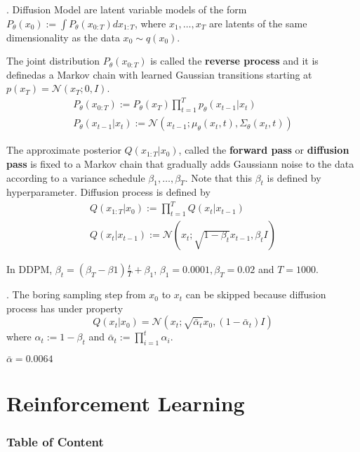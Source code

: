 \documentclass[8pt]{beamer}
\newcommand{\mc}[1]{\mathcal{#1}}
\newcommand{\tb}[1]{\textbf{#1}}
\begin{document}
\begin{frame}{.}
    Diffusion Model are latent variable models of the form $P_\theta(x_0) := \int P_\theta (x_{0:T})dx_{1:T}$, where $x_1, \dots, x_T$ are latents of the same dimensionality as the data $x_0 \sim q(x_0)$.

    The joint distribution $P_\theta(x_{0:T})$ is called the \tb{reverse process} and it is definedas a Markov chain with learned Gaussian transitions starting at $p(x_T) = \mc{N}(x_T; 0, I)$.
    \[
    \begin{gathered}
        P_\theta(x_{0:T}) := P_\theta(x_T) \prod_{t=1}^T p_\theta(x_{t-1}|x_{t}) \\
        P_\theta(x_{t-1}|x_{t}) := \mc{N}(x_{t-1}; \mu_\theta(x_t, t), \Sigma_\theta (x_t, t))
    \end{gathered}
    \]

    The approximate posterior $Q(x_{1:T}|x_0)$, called the \tb{forward pass} or \tb{diffusion pass} is fixed to a Markov chain that gradually adds Gaussiann noise to the data according to a variance schedule $\beta_1, \dots, \beta_T$. Note that this $\beta_t$ is defined by hyperparameter.
    Diffusion process is defined by
    \[
    \begin{gathered}
        Q(x_{1:T}|x_0) := \prod_{t=1}^T Q(x_t|x_{t-1})\\
        Q(x_t|x_{t-1}):= \mc{N}(x_t; \sqrt{1-\beta_t}x_{t-1}, \beta_t I)
    \end{gathered}
    \]

    In DDPM, $\beta_t = (\beta_T - \beta1)\frac{t}{T} + \beta_1$, $\beta_1 = 0.0001, \beta_T = 0.02$ and $T=1000$.
\end{frame}

\begin{frame}{.}
    The boring sampling step from $x_0$ to $x_t$ can be skipped because diffusion process has under property
    \[
        Q(x_t|x_0) = \mc{N}(x_t; \sqrt{\bar{\alpha}_t}x_0, (1- \bar{\alpha}_t)I)
    \]
    where $\alpha_t:= 1- \beta_t$ and $\bar{\alpha}_t := \prod_{i=1}^t \alpha_i$.

    $\bar{\alpha} = 0.0064$

\end{frame}

\section{Reinforcement Learning}
\begingroup
    \begin{frame}
        \begin{multicols}{2}
            \frametitle{Table of Content}
            \tableofcontents
        \end{multicols}
    \end{frame}
\endgroup
\end{document}

